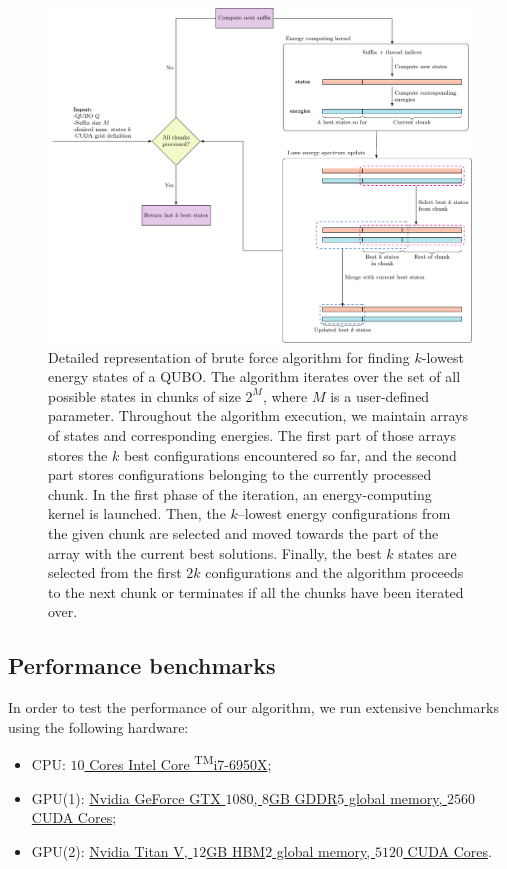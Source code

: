 \begin{figure}
  \includegraphics[width=\textwidth]{figures/bruteforce}
  \caption{
    Detailed representation of brute force algorithm for finding $k$-lowest energy
    states of a QUBO. The algorithm iterates over the set of all possible states in
    chunks of size $2^{M}$, where $M$ is a user-defined parameter. Throughout the
    algorithm execution, we maintain arrays of states and corresponding energies.
    The first part of those arrays stores the $k$ best configurations encountered
    so far, and the second part stores configurations belonging to the currently
    processed chunk. In the first phase of the iteration, an energy-computing
    kernel is launched. Then, the $k$--lowest energy configurations from the given
    chunk are selected and moved towards the part of the array with the current
    best solutions. Finally, the best $k$ states are selected from the first $2k$
    configurations and the algorithm proceeds to the next chunk or terminates if
    all the chunks have been iterated over. } \label{fig:bruteforce}
\end{figure}

\subsection{Performance benchmarks}
In order to test the performance of our algorithm, we run extensive benchmarks
using the following hardware:
%
\begin{itemize}
  \item CPU:
    \href{https://ark.intel.com/products/94456/Intel-Core-i7-6950X-Processor-Extreme-Edition-25M-Cache-up-to-3-50-GHz-}{$10$
      Cores {\rmfamily Intel\textregistered} Core \textsuperscript{TM}i7-6950X};
  \item GPU(1):
    \href{https://www.nvidia.com/en-us/geforce/products/10series/geforce-gtx-1080}{Nvidia
      GeForce GTX $1080$, $8$GB GDDR$5$ global memory, $2560$ CUDA Cores};
  \item  GPU(2): \href{https://www.nvidia.com/en-us/titan/titan-v/}{Nvidia Titan V,
      $12$GB HBM$2$ global memory, $5120$ CUDA Cores}.
\end{itemize}

